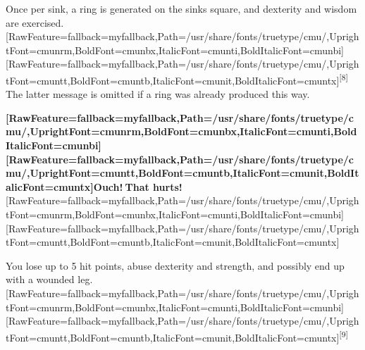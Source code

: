 \begin{myquote}
\item{}Once per sink, a ring is generated on the sink\textquotesingle{}s square, and dexterity and wisdom\footnotemark[60] are exercised.\allowbreak{}\setmainfont{cmunrm.ttf}[RawFeature={fallback=myfallback},Path=/usr/share/fonts/truetype/cmu/,UprightFont=cmunrm,BoldFont=cmunbx,ItalicFont=cmunti,BoldItalicFont=cmunbi]\setmonofont{cmunrm.ttf}[RawFeature={fallback=myfallback},Path=/usr/share/fonts/truetype/cmu/,UprightFont=cmuntt,BoldFont=cmuntb,ItalicFont=cmunit,BoldItalicFont=cmuntx]\textsuperscript{{$\text{[}$}8{$\text{]}$}} The latter message is omitted if a ring was already produced this way.
\end{myquote}

{\bfseries \allowbreak{}\setmainfont{cmunbx.ttf}[RawFeature={fallback=myfallback},Path=/usr/share/fonts/truetype/cmu/,UprightFont=cmunrm,BoldFont=cmunbx,ItalicFont=cmunti,BoldItalicFont=cmunbi]\setmonofont{cmunbx.ttf}[RawFeature={fallback=myfallback},Path=/usr/share/fonts/truetype/cmu/,UprightFont=cmuntt,BoldFont=cmuntb,ItalicFont=cmunit,BoldItalicFont=cmuntx]\bfseries Ouch!{\mbox{$~$}}That hurts!}\allowbreak{}\setmainfont{cmunrm.ttf}[RawFeature={fallback=myfallback},Path=/usr/share/fonts/truetype/cmu/,UprightFont=cmunrm,BoldFont=cmunbx,ItalicFont=cmunti,BoldItalicFont=cmunbi]\setmonofont{cmunrm.ttf}[RawFeature={fallback=myfallback},Path=/usr/share/fonts/truetype/cmu/,UprightFont=cmuntt,BoldFont=cmuntb,ItalicFont=cmunit,BoldItalicFont=cmuntx]

\begin{myquote}
\item{}You lose up to 5 hit points, abuse dexterity and strength\footnotemark[61], and possibly end up with a wounded leg.\allowbreak{}\setmainfont{cmunrm.ttf}[RawFeature={fallback=myfallback},Path=/usr/share/fonts/truetype/cmu/,UprightFont=cmunrm,BoldFont=cmunbx,ItalicFont=cmunti,BoldItalicFont=cmunbi]\setmonofont{cmunrm.ttf}[RawFeature={fallback=myfallback},Path=/usr/share/fonts/truetype/cmu/,UprightFont=cmuntt,BoldFont=cmuntb,ItalicFont=cmunit,BoldItalicFont=cmuntx]\textsuperscript{{$\text{[}$}9{$\text{]}$}}
\end{myquote}


